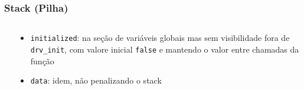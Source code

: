 \documentclass{beamer}
\begin{document}
\begin{frame}
	\frametitle{Stack (Pilha)}
	\begin{columns}[T] %
		\begin{column}{.60\textwidth}
			
		\end{column}%
		\hfill%
        \pause
		\begin{column}{.40\textwidth}
    {\footnotesize
	\begin{itemize}
	\item \texttt{initialized}: na seção de variáveis globais mas sem visibilidade fora de \texttt{drv\_init}, com valore inicial \texttt{false} e mantendo o valor entre chamadas da função
    \item \texttt{data}: idem, não penalizando o stack
	\end{itemize}
    }
		\end{column}%
	\end{columns}
\end{frame}
\end{document}
